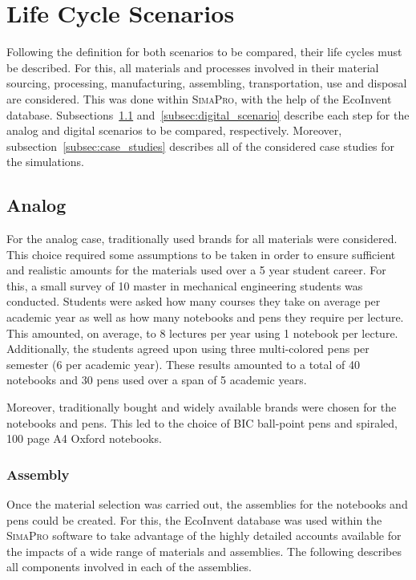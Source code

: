 \section{Life Cycle Scenarios}\label{sec:scenarios}
Following the definition for both scenarios to be compared, their life cycles must be described. For this, all materials and processes involved in their material sourcing, processing, manufacturing, assembling, transportation, use and disposal are considered. This was done within \textsc{SimaPro}, with the help of the EcoInvent database. Subsections~\ref{subsec:analog_scenario} and~\ref{subsec:digital_scenario} describe each step for the analog and digital scenarios to be compared, respectively. Moreover, subsection~\ref{subsec:case_studies} describes all of the considered case studies for the simulations.


\subsection{Analog}\label{subsec:analog_scenario}
For the analog case, traditionally used brands for all materials were considered. This choice required some assumptions to be taken in order to ensure sufficient and realistic amounts for the materials used over a 5 year student career. For this, a small survey of 10 master in mechanical engineering students was conducted. Students were asked how many courses they take on average per academic year as well as how many notebooks and pens they require per lecture. This amounted, on average, to 8 lectures per year using 1 notebook per lecture. Additionally, the students agreed upon using three multi-colored pens per semester (6 per academic year). These results amounted to a total of 40 notebooks and 30 pens used over a span of 5 academic years.

Moreover, traditionally bought and widely available brands were chosen for the notebooks and pens. This led to the choice of BIC ball-point pens and spiraled, 100 page A4 Oxford notebooks.

\subsubsection*{Assembly}
Once the material selection was carried out, the assemblies for the notebooks and pens could be created. For this, the EcoInvent database was used within the \textsc{SimaPro} software to take advantage of the highly detailed accounts available for the impacts of a wide range of materials and assemblies. The following describes all components involved in each of the assemblies.

